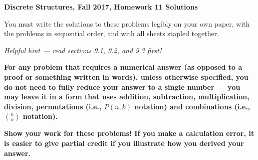 \documentclass[11pt, letterpaper]{report}
\begin{document}
{\textbf{Discrete Structures, Fall 2017, Homework 11 Solutions}}

\vspace*{.1in}

You must write the solutions to these problems legibly on your own paper, with
the problems in sequential order, and with all sheets stapled together.

\medskip

\emph{Helpful hint --- read sections 9.1, 9.2, and 9.3 first!}

\medskip

\textbf{For any problem that requires a numerical answer (as opposed to a proof or something written in words), unless otherwise specified, you do not need to fully reduce your
answer to a single number --- you may leave it in a form that uses addition, subtraction, multiplication, division, permutations (i.e., $P(n,k)$ notation)
and combinations (i.e., $\binom{n}{k}$ notation).}

\medskip

\textbf{Show your work for these problems! If you make a calculation error, it is easier to give partial credit if you illustrate how you derived your answer.}
\end{document}
